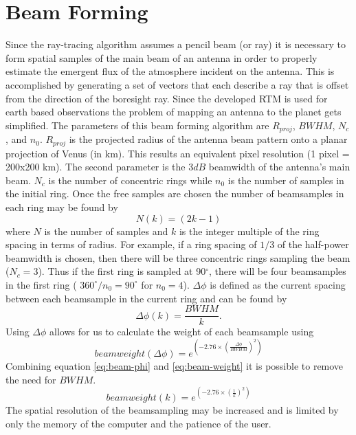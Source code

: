 \section{Beam Forming}

Since the ray-tracing algorithm assumes a pencil beam (or ray) it is necessary to form spatial samples of the main beam of an antenna in order to properly estimate the emergent flux of the atmosphere incident on the antenna. This is accomplished by generating a set of vectors that each describe a ray that is offset from the direction of the boresight ray. Since the developed RTM is used for earth based observations the problem of mapping an antenna to the planet gets simplified. The parameters of this beam forming algorithm are $R_{proj}$, $BWHM$, $N_c$, and $n_0$. $R_{proj}$ is the projected radius of the antenna beam pattern onto a planar projection of Venus (in km). This results an equivalent pixel resolution (1 pixel = 200x200 km). The second parameter is the $3dB$ beamwidth of the antenna's main beam. $N_c$ is the number of concentric rings while $n_0$ is the number of samples in the initial ring. Once the free samples are chosen the number of beamsamples in each ring may be found by
\begin{equation}
N(k) = (2k-1)
\end{equation} %
where $N$ is the number of samples and $k$ is the integer multiple of the ring spacing in terms of radius. For example, if a ring spacing of $1/3$ of the half-power beamwidth is chosen, then there will be three concentric rings sampling the beam ($N_c=3$). Thus if the first ring is sampled at 90$^\circ$, there will be four beamsamples in the first ring ( $360^\circ / n_0 = 90^\circ$ for $n_0 = 4$). $\Delta\phi$ is defined as the current spacing between each beamsample in the current ring and can be found by
\begin{equation}\label{eq:beam-phi}
\Delta\phi(k) = \frac{BWHM}{k}.
\end{equation} 
Using $\Delta\phi$ allows for us to calculate the weight of each beamsample using
\begin{equation} \label{eq:beam-weight}
beamweight(\Delta\phi) = e^{\left( -2.76\times \left(\frac{\Delta\phi}{BWHM}\right)^2\right)}
\end{equation}
Combining equation \ref{eq:beam-phi} and \ref{eq:beam-weight} it is possible to remove the need for $BWHM$.
\begin{equation}
beamweight(k) = e^{\left( -2.76\times \left(\frac{1}{k}\right)^2\right)}
\end{equation}
The spatial resolution of the beamsampling may be increased and is limited by only the memory of the computer and the patience of the user. 